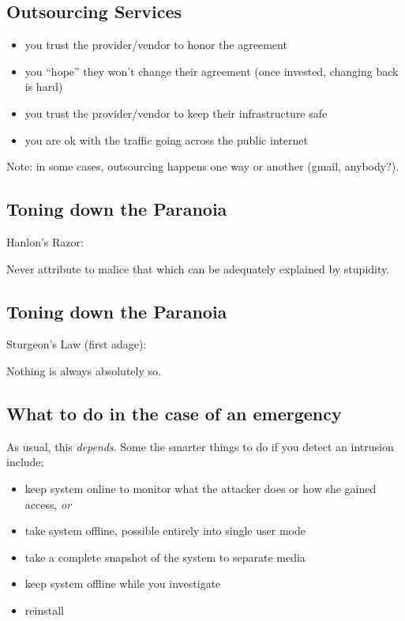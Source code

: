 \documentclass[xga]{xdvislides}
\begin{document}
\subsection{Outsourcing Services}
\begin{itemize}
	\item you trust the provider/vendor to honor the agreement
	\item you ``hope'' they won't change their agreement (once
		invested, changing back is hard)
	\item you trust the provider/vendor to keep their infrastructure
		safe
	\item you are ok with the traffic going across the public internet
\end{itemize}
\vspace{.5in}

Note: in some cases, outsourcing happens one way or another (gmail,
anybody?).


\subsection{Toning down the Paranoia}
Hanlon's Razor:
\\

\Huge
\begin{center}
Never attribute to malice that which can be adequately explained by stupidity.
\end{center}
\Normalsize

\subsection{Toning down the Paranoia}
Sturgeon's Law (first adage):
\\

\Huge
\begin{center}
Nothing is always absolutely so.
\end{center}
\Normalsize


\subsection{What to do in the case of an emergency}

As usual, this {\em depends}.  Some the smarter things to do if you detect an
intrusion include:

\begin{itemize}
	\item keep system online to monitor what the attacker does or how she
		gained access, {\em or}
	\item take system offline, possible entirely into single user mode
	\item take a complete snapshot of the system to separate media
	\item keep system offline while you investigate
	\item reinstall
\end{itemize}
\end{document}
